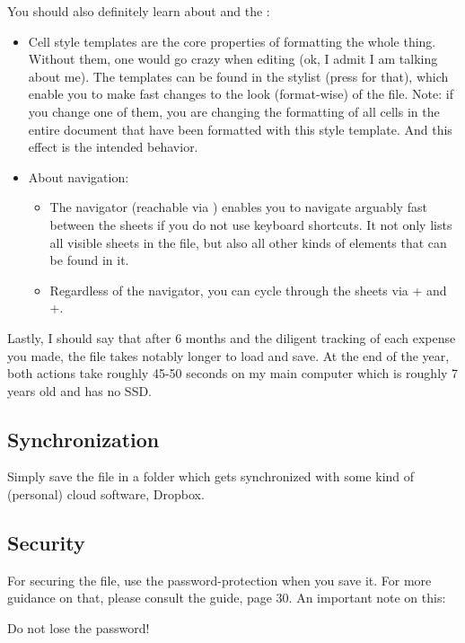 You should also definitely learn about  and the :
\begin{itemize}
	\item Cell style templates are the core properties of formatting the whole thing.
	Without them, one would go crazy when editing \tfn (ok, I admit I am talking about me).
	The templates can be found in the stylist (press  for that), which enable you to make fast changes to the look (format-wise) of the file.
	Note: if you change one of them, you are changing the formatting of all cells in the entire document that have been formatted with this style template.
	And this effect is the intended behavior.
	\item About navigation:
	\begin{itemize}
		\item The navigator (reachable via ) enables you to navigate arguably fast between the sheets if you do not use keyboard shortcuts.
		It not only lists all visible sheets in the file, but also all other kinds of elements that can be found in it.
		\item Regardless of the navigator, you can cycle through the sheets via + and +.
	\end{itemize}
\end{itemize}

Lastly, I should say that after 6 months and the diligent tracking of each expense you made, the file takes notably longer to load and save.
At the end of the year, both actions take roughly 45-50 seconds on my main computer which is roughly 7 years old and has no SSD.

\subsection{Synchronization}
\label{subsec:synchronization}

Simply save the file in a folder which gets synchronized with some kind of (personal) cloud software, \eg Dropbox.

\subsection{Security}
\label{subsec:security}

For securing the file, use the password-protection when you save it.
For more guidance on that, please consult the  guide, page 30.
An important note on this:
\begin{specialnote}
Do not lose the password!
\end{specialnote}

